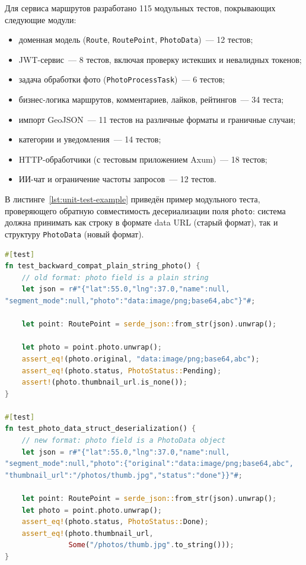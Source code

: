 Для сервиса маршрутов разработано 115 модульных тестов, покрывающих следующие модули:
\begin{itemize}
  \item доменная модель (\texttt{Route}, \texttt{RoutePoint}, \texttt{PhotoData})~--- 12 тестов;
  \item JWT-сервис~--- 8 тестов, включая проверку истекших и невалидных токенов;
  \item задача обработки фото (\texttt{PhotoProcessTask})~--- 6 тестов;
  \item бизнес-логика маршрутов, комментариев, лайков, рейтингов~--- 34 теста;
  \item импорт GeoJSON~--- 11 тестов на различные форматы и граничные случаи;
  \item категории и уведомления~--- 14 тестов;
  \item HTTP-обработчики (с тестовым приложением Axum)~--- 18 тестов;
  \item ИИ-чат и ограничение частоты запросов~--- 12 тестов.
\end{itemize}

В листинге~\ref{lst:unit-test-example} приведён пример модульного теста, проверяющего обратную совместимость десериализации поля \texttt{photo}: система должна принимать как строку в формате data URL (старый формат), так и структуру \texttt{PhotoData} (новый формат).

\begin{lstlisting}[language=Rust, caption={Тест обратной совместимости десериализации фото}, label={lst:unit-test-example}]
#[test]
fn test_backward_compat_plain_string_photo() {
    // old format: photo field is a plain string
    let json = r#"{"lat":55.0,"lng":37.0,"name":null,
"segment_mode":null,"photo":"data:image/png;base64,abc"}"#;

    let point: RoutePoint = serde_json::from_str(json).unwrap();

    let photo = point.photo.unwrap();
    assert_eq!(photo.original, "data:image/png;base64,abc");
    assert_eq!(photo.status, PhotoStatus::Pending);
    assert!(photo.thumbnail_url.is_none());
}

#[test]
fn test_photo_data_struct_deserialization() {
    // new format: photo field is a PhotoData object
    let json = r#"{"lat":55.0,"lng":37.0,"name":null,
"segment_mode":null,"photo":{"original":"data:image/png;base64,abc",
"thumbnail_url":"/photos/thumb.jpg","status":"done"}}"#;

    let point: RoutePoint = serde_json::from_str(json).unwrap();
    let photo = point.photo.unwrap();
    assert_eq!(photo.status, PhotoStatus::Done);
    assert_eq!(photo.thumbnail_url,
               Some("/photos/thumb.jpg".to_string()));
}
\end{lstlisting}

